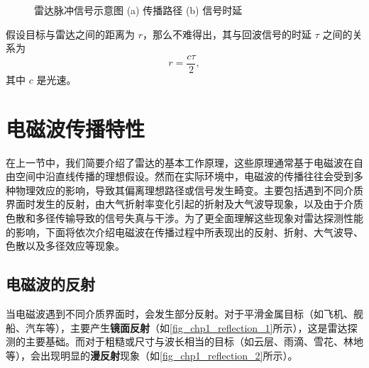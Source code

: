 \begin{figure}[htb!]
\begin{subfigure}{.8\textwidth}
        \caption{}
        \label{fig_chp1_radar_pulse_2}
    \end{subfigure}
    \caption{雷达脉冲信号示意图 (a) 传播路径 (b) 信号时延}
    \label{fig_chp1_radar_pulse}
\end{figure}

假设目标与雷达之间的距离为 $r$，那么不难得出，其与回波信号的时延 $\tau$ 之间的关系为
\begin{equation}
    r = \frac{c \tau}{2},
    \label{eq:radar_time_delay}
\end{equation}
其中 $c$ 是光速。

\section{电磁波传播特性}

在上一节中，我们简要介绍了雷达的基本工作原理，这些原理通常基于电磁波在自由空间中沿直线传播的理想假设。然而在实际环境中，电磁波的传播往往会受到多种物理效应的影响，导致其偏离理想路径或信号发生畸变。主要包括遇到不同介质界面时发生的反射，由大气折射率变化引起的折射及大气波导现象，以及由于介质色散和多径传输导致的信号失真与干涉。为了更全面理解这些现象对雷达探测性能的影响，下面将依次介绍电磁波在传播过程中所表现出的反射、折射、大气波导、色散以及多径效应等现象。

\subsection{电磁波的反射}

当电磁波遇到不同介质界面时，会发生部分反射。对于平滑金属目标（如飞机、舰船、汽车等），主要产生\textbf{镜面反射}（如\cref{fig_chp1_reflection_1}所示），这是雷达探测的主要基础。而对于粗糙或尺寸与波长相当的目标（如云层、雨滴、雪花、林地等），会出现明显的\textbf{漫反射}现象（如\cref{fig_chp1_reflection_2}所示）。

